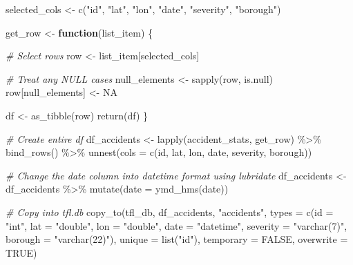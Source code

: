\documentclass[
]{article}
\newenvironment{Shaded}{\begin{snugshade}}{\end{snugshade}}
\newcommand{\AttributeTok}[1]{\textcolor[rgb]{0.77,0.63,0.00}{#1}}
\newcommand{\CommentTok}[1]{\textcolor[rgb]{0.56,0.35,0.01}{\textit{#1}}}
\newcommand{\ConstantTok}[1]{\textcolor[rgb]{0.00,0.00,0.00}{#1}}
\newcommand{\ControlFlowTok}[1]{\textcolor[rgb]{0.13,0.29,0.53}{\textbf{#1}}}
\newcommand{\FunctionTok}[1]{\textcolor[rgb]{0.00,0.00,0.00}{#1}}
\newcommand{\NormalTok}[1]{#1}
\newcommand{\OtherTok}[1]{\textcolor[rgb]{0.56,0.35,0.01}{#1}}
\newcommand{\SpecialCharTok}[1]{\textcolor[rgb]{0.00,0.00,0.00}{#1}}
\newcommand{\StringTok}[1]{\textcolor[rgb]{0.31,0.60,0.02}{#1}}
\begin{document}
\begin{Shaded}
\begin{Highlighting}[]
\NormalTok{ selected\_cols }\OtherTok{\textless{}{-}} \FunctionTok{c}\NormalTok{(}\StringTok{"id"}\NormalTok{, }\StringTok{"lat"}\NormalTok{, }
                     \StringTok{"lon"}\NormalTok{, }\StringTok{"date"}\NormalTok{, }
                     \StringTok{"severity"}\NormalTok{, }\StringTok{"borough"}\NormalTok{)}
  
\NormalTok{  get\_row }\OtherTok{\textless{}{-}} \ControlFlowTok{function}\NormalTok{(list\_item) \{}
    
    \CommentTok{\# Select rows}
\NormalTok{    row }\OtherTok{\textless{}{-}}\NormalTok{ list\_item[selected\_cols]}
    
    \CommentTok{\# Treat any NULL cases}
\NormalTok{    null\_elements }\OtherTok{\textless{}{-}} \FunctionTok{sapply}\NormalTok{(row, is.null)}
\NormalTok{    row[null\_elements] }\OtherTok{\textless{}{-}} \ConstantTok{NA}
    
\NormalTok{    df }\OtherTok{\textless{}{-}} \FunctionTok{as\_tibble}\NormalTok{(row)}
    \FunctionTok{return}\NormalTok{(df)}
\NormalTok{  \}}
  
  \CommentTok{\# Create entire df}
\NormalTok{  df\_accidents }\OtherTok{\textless{}{-}} \FunctionTok{lapply}\NormalTok{(accident\_stats, get\_row) }\SpecialCharTok{\%\textgreater{}\%} 
    \FunctionTok{bind\_rows}\NormalTok{() }\SpecialCharTok{\%\textgreater{}\%} 
    \FunctionTok{unnest}\NormalTok{(}\AttributeTok{cols =} \FunctionTok{c}\NormalTok{(id, lat, lon, date, severity, borough))}
  
  \CommentTok{\# Change the \textasciigrave{}date\textasciigrave{} column into datetime format using lubridate}
\NormalTok{  df\_accidents }\OtherTok{\textless{}{-}}\NormalTok{ df\_accidents }\SpecialCharTok{\%\textgreater{}\%}
    \FunctionTok{mutate}\NormalTok{(}\AttributeTok{date =} \FunctionTok{ymd\_hms}\NormalTok{(date))}
  
  \CommentTok{\# Copy into tfl.db}
  \FunctionTok{copy\_to}\NormalTok{(tfl\_db, df\_accidents, }\StringTok{"accidents"}\NormalTok{,}
          \AttributeTok{types =} \FunctionTok{c}\NormalTok{(}\AttributeTok{id =} \StringTok{"int"}\NormalTok{,}
                    \AttributeTok{lat =} \StringTok{"double"}\NormalTok{,}
                    \AttributeTok{lon =} \StringTok{"double"}\NormalTok{,}
                    \AttributeTok{date =} \StringTok{"datetime"}\NormalTok{,}
                    \AttributeTok{severity =} \StringTok{"varchar(7)"}\NormalTok{,}
                    \AttributeTok{borough =} \StringTok{"varchar(22)"}\NormalTok{),}
          \AttributeTok{unique =} \FunctionTok{list}\NormalTok{(}\StringTok{"id"}\NormalTok{),}
          \AttributeTok{temporary =} \ConstantTok{FALSE}\NormalTok{, }\AttributeTok{overwrite =} \ConstantTok{TRUE}\NormalTok{)}
\end{Highlighting}
\end{Shaded}
\end{document}
